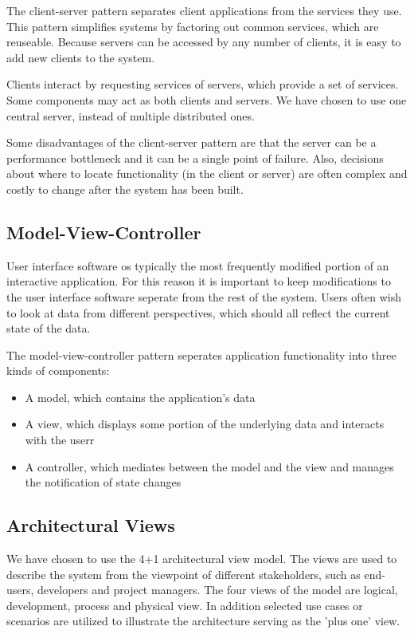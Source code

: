 \documentclass{report}
\begin{document}
The client-server pattern separates client applications from the services they use. This pattern simplifies systems by factoring out common services, which are reuseable. Because servers can be accessed by any number of clients, it is easy to add new clients to the system.

Clients interact by requesting services of servers, which provide a set of services. Some components may act as both clients and servers. We have chosen to use one central server, instead of multiple distributed ones.

Some disadvantages of the client-server pattern are that the server can be a performance bottleneck and it can be a single point of failure. Also, decisions about where to locate functionality (in the client or server) are often complex and costly to change after the system has been built.

\subsection{Model-View-Controller}
User interface software os typically the most frequently modified portion of an interactive application. For this reason it is important to keep modifications to the user interface software seperate from the rest of the system. Users often wish to look at data from different perspectives, which should all reflect the current state of the data.

The model-view-controller pattern seperates application functionality into three kinds of components:

\begin{itemize}
    \item A model, which contains the application's data
    \item A view, which displays some portion of the underlying data and interacts with the userr
    \item A controller, which mediates between the model and the view and manages the notification of state changes 
\end{itemize}


\subsection{Architectural Views} \label{sec:architectural_views}
We have chosen to use the 4+1 architectural view model. The views are used to describe the system from the viewpoint of different stakeholders, such as end-users, developers and project managers. The four views of the model are logical, development, process and physical view. In addition selected use cases or scenarios are utilized to illustrate the architecture serving as the 'plus one' view. \cite{website:kruchten}
\end{document}
